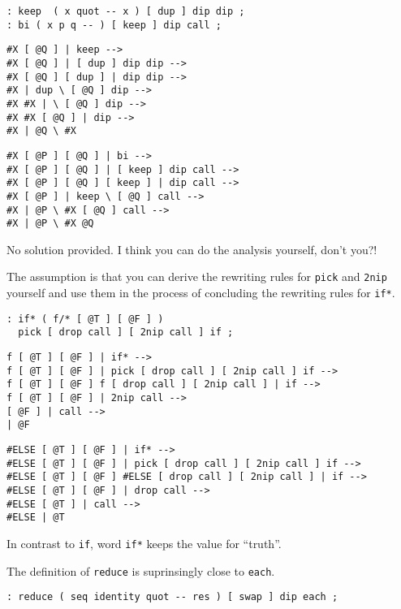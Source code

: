 \begin{verbatim}
: keep  ( x quot -- x ) [ dup ] dip dip ;
: bi ( x p q -- ) [ keep ] dip call ;
\end{verbatim}

\begin{verbatim}
#X [ @Q ] | keep -->
#X [ @Q ] | [ dup ] dip dip -->
#X [ @Q ] [ dup ] | dip dip -->
#X | dup \ [ @Q ] dip -->
#X #X | \ [ @Q ] dip -->
#X #X [ @Q ] | dip -->
#X | @Q \ #X
\end{verbatim}

\begin{verbatim}
#X [ @P ] [ @Q ] | bi -->
#X [ @P ] [ @Q ] | [ keep ] dip call -->
#X [ @P ] [ @Q ] [ keep ] | dip call -->
#X [ @P ] | keep \ [ @Q ] call -->
#X | @P \ #X [ @Q ] call -->
#X | @P \ #X @Q
\end{verbatim}

No solution provided. I think you can do the analysis yourself, don't you?!

The assumption is that you can derive the rewriting rules for \verb|pick| and \verb|2nip| yourself and use them in the process of concluding the rewriting rules for \verb|if*|.

\begin{verbatim}
: if* ( f/* [ @T ] [ @F ] )
  pick [ drop call ] [ 2nip call ] if ;
\end{verbatim}

\begin{verbatim}
f [ @T ] [ @F ] | if* -->
f [ @T ] [ @F ] | pick [ drop call ] [ 2nip call ] if -->
f [ @T ] [ @F ] f [ drop call ] [ 2nip call ] | if -->
f [ @T ] [ @F ] | 2nip call -->
[ @F ] | call -->
| @F
\end{verbatim}

\begin{verbatim}
#ELSE [ @T ] [ @F ] | if* -->
#ELSE [ @T ] [ @F ] | pick [ drop call ] [ 2nip call ] if -->
#ELSE [ @T ] [ @F ] #ELSE [ drop call ] [ 2nip call ] | if -->
#ELSE [ @T ] [ @F ] | drop call -->
#ELSE [ @T ] | call -->
#ELSE | @T
\end{verbatim}

In contrast to \verb|if|, word \verb|if*| keeps the value for ``truth''.
 
The definition of \verb|reduce| is suprinsingly close to \verb|each|.

\begin{verbatim}
: reduce ( seq identity quot -- res ) [ swap ] dip each ;
\end{verbatim}

